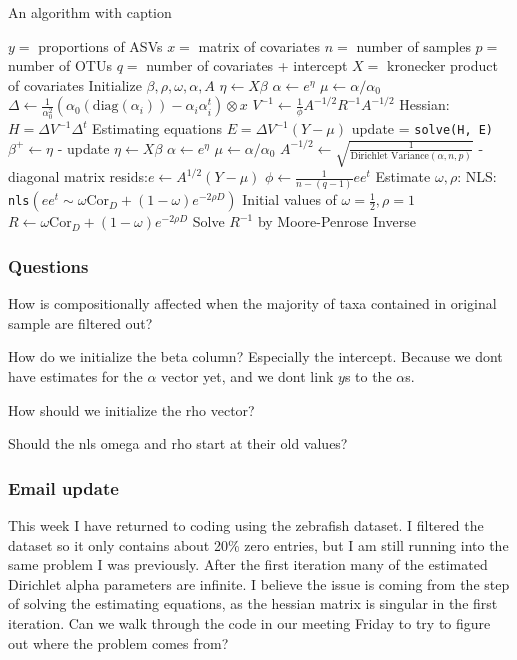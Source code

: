 \documentclass[10pt]{article}
\begin{document}
\begin{algorithm}
\caption{An algorithm with caption}\label{alg:cap}
\begin{algorithmic}
\State $y = $ proportions of ASVs
\State $x = $ matrix of covariates
\State $n = $ number of samples
\State $p = $ number of OTUs
\State $q = $ number of covariates + intercept
\State $X = $ kronecker product of covariates
\State Initialize $\beta, \rho, \omega, \alpha, A$
\Loop
  \Loop
  \State $\eta \gets X \beta$
  \State $\alpha \gets e^\eta$
  \State $\mu \gets \alpha/\alpha_0$
  \State $\Delta \gets \frac{1}{\alpha_0^2} ( \alpha_0(\text{diag}(\alpha_i)) - \alpha_i \alpha_i^t ) \otimes x $
  \State $V^{-1} \gets \frac{1}{\phi} A^{-1/2} R^{-1} A^{-1/2}$
  \State Hessian: $H = \Delta V ^{-1} \Delta^t$
  \State Estimating equations $E = \Delta V ^{-1}(Y - \mu)$
  \State update = \texttt{solve(H, E)}
  \State $\beta^+ \gets \eta$ - update
  \EndLoop
  \State $\eta \gets X \beta$
  \State $\alpha \gets e^\eta$
  \State $\mu \gets \alpha/\alpha_0$
  \State $A^{-1/2} \gets \sqrt{\frac{1}{\text{Dirichlet Variance}(\alpha,n,p)}}$ - diagonal matrix
  \State resids:$e \gets A^{1/2}(Y - \mu)$
  \State $\phi \gets \frac{1}{n-(q-1)} e e^t$
  \State Estimate $\omega, \rho$: NLS: \texttt{nls}$(e e^t \sim \omega \text{Cor}_D + (1 - \omega)e^{-2\rho D})$
  Initial values of $\omega = \tfrac{1}{2}, \rho = 1$
  \State $R \gets \omega\text{Cor}_D + (1 - \omega)e^{-2\rho D}$
  \State Solve $R ^{-1} $ by Moore-Penrose Inverse

\EndLoop
\end{algorithmic}
\end{algorithm}

\subsubsection*{Questions}
How is compositionally affected when the majority of taxa contained in original sample are filtered out?

How do we initialize the beta column? Especially the intercept. Because we dont have estimates for the $\alpha$ vector yet, and we dont link $y$s to the $\alpha$s.

How should we initialize the rho vector?

Should the nls omega and rho start at their old values?

\subsubsection*{Email update}
This week I have returned to coding using the zebrafish dataset. I filtered the dataset so it only contains about 20\% zero entries, but I am still running into the same problem I was previously. After the first iteration many of the estimated Dirichlet alpha parameters are infinite. I believe the issue is coming from the step of solving the estimating equations, as the hessian matrix is singular in the first iteration. Can we walk through the code in our meeting Friday to try to figure out where the problem comes from?
\end{document}
